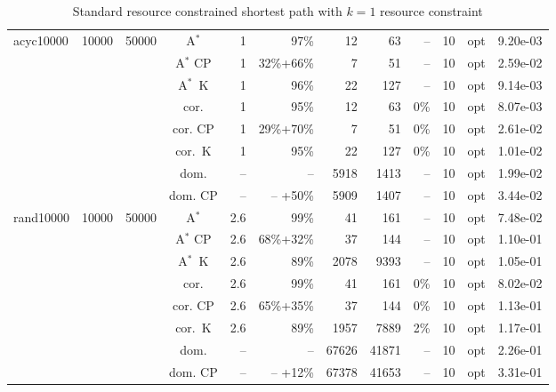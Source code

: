 \documentclass[11pt]{amsart}
\newenvironment{outdent}
{\begin{list}{}{\leftmargin-2cm\rightmargin\leftmargin}\centering\item\relax}
{\end{list}\ignorespacesafterend}
\theoremstyle{plain}
\theoremstyle{remark}
\begin{document}
\begin{table}
\begin{outdent}
\begin{footnotesize}
\begin{tabular}{|l|rrc|rr|rrr|rr|r|}
\hline
acyc10000 & 10000 & 50000 & A$^*$ & 1 & 97\% &12 & 63 & -- &10 & opt & 9.20e-03 \\
&&&A$^*$ CP & 1 & 32\%+66\% &7 & 51 & -- &10 & opt & 2.59e-02 \\
&&&A$^*$~K & 1 & 96\% &22 & 127 & -- &10 & opt & 9.14e-03 \\
&&&cor. & 1 & 95\% &12 & 63 & 0\% &10 & opt & 8.07e-03 \\
&&&cor. CP & 1 & 29\%+70\% &7 & 51 & 0\% &10 & opt & 2.61e-02 \\
&&&cor.~K & 1 & 95\% &22 & 127 & 0\% &10 & opt & 1.01e-02 \\
&&&dom. & -- & --  &5918 & 1413 & -- &10 & opt & 1.99e-02 \\
&&&dom. CP & -- & -- +50\% &5909 & 1407 & -- &10 & opt & 3.44e-02 \\
\hline
rand10000 & 10000 & 50000 & A$^*$ & 2.6 & 99\% &41 & 161 & -- &10 & opt & 7.48e-02 \\
&&&A$^*$ CP & 2.6 & 68\%+32\% &37 & 144 & -- &10 & opt & 1.10e-01 \\
&&&A$^*$~K & 2.6 & 89\% &2078 & 9393 & -- &10 & opt & 1.05e-01 \\
&&&cor. & 2.6 & 99\% &41 & 161 & 0\% &10 & opt & 8.02e-02 \\
&&&cor. CP & 2.6 & 65\%+35\% &37 & 144 & 0\% &10 & opt & 1.13e-01 \\
&&&cor.~K & 2.6 & 89\% &1957 & 7889 & 2\% &10 & opt & 1.17e-01 \\
&&&dom. & -- & --  &67626 & 41871 & -- &10 & opt & 2.26e-01 \\
&&&dom. CP & -- & -- +12\% &67378 & 41653 & -- &10 & opt & 3.31e-01 \\
\hline
\end{tabular}
\end{footnotesize}
\end{outdent}
\caption{Standard resource constrained shortest path with $k=1$ resource constraint}
\label{tab:RCSP1constraint}
\end{table}
\end{document}
